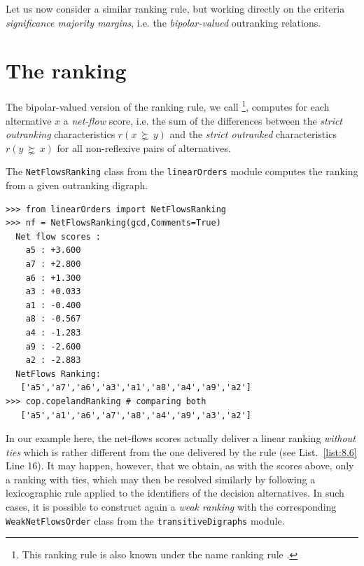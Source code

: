 Let us now consider a similar ranking rule, but working directly on the criteria \emph{significance majority margins}, i.e. the \emph{bipolar-valued} outranking relations.

\section{The \NetFlows ranking}
\label{sec:8.3}

\begin{definition}\label{def:8.3}

\noindent The bipolar-valued version of the \Copeland ranking rule, we call \NetFlows \footnote{This ranking rule is also known under the name \Promethee ranking rule \citep*{BRA-1985}.}, computes for each alternative $x$ a \emph{net-flow} score,  i.e. the sum of the differences between the \emph{strict outranking} characteristics $r(x\, \succnsim \,y)$ and the \emph{strict outranked} characteristics $r(y\, \succnsim \,x)$ for all non-reflexive pairs of alternatives.
\end{definition}

The \texttt{NetFlowsRanking} class from the \texttt{linearOrders} module computes the \NetFlows ranking from a given outranking digraph.
\begin{lstlisting}[caption={Computing a \NetFlows ranking},label=list:8.6]
>>> from linearOrders import NetFlowsRanking
>>> nf = NetFlowsRanking(gcd,Comments=True)
  Net flow scores :
    a5 : +3.600
    a7 : +2.800
    a6 : +1.300
    a3 : +0.033
    a1 : -0.400
    a8 : -0.567
    a4 : -1.283
    a9 : -2.600
    a2 : -2.883
  NetFlows Ranking:
   ['a5','a7','a6','a3','a1','a8','a4','a9','a2']
>>> cop.copelandRanking # comparing both
   ['a5','a1','a6','a7','a8','a4','a9','a3','a2']
\end{lstlisting}

In our example here, the net-flows scores actually deliver a linear ranking \emph{without ties} which is rather different from the one delivered by the \Copeland rule (see List.~\vref{list:8.6} Line 16). It may happen, however, that we obtain, as with the \Copeland scores above, only a ranking with ties, which may then be resolved similarly by following a lexicographic rule applied to the identifiers of the decision alternatives. In such cases, it is possible to construct again a \emph{weak ranking} with the corresponding \texttt{WeakNetFlowsOrder} class from the \texttt{transitiveDigraphs} module.

